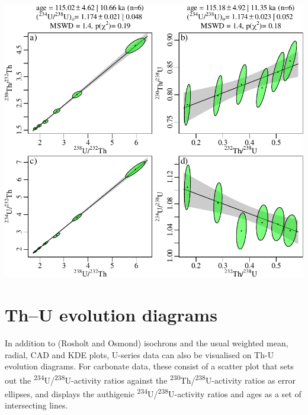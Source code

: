 \begin{refsection}
\noindent\begin{minipage}[t][][b]{.65\linewidth}
\includegraphics[width=\textwidth]{../figures/ThUisochron.pdf}
\end{minipage}
\begin{minipage}[t][][t]{.35\linewidth}
  \label{fig:ThUisochron}
\end{minipage}

\section{Th--U evolution diagrams}\label{sec:ThUevolution}

In addition to (Rosholt and Osmond) isochrons and the usual weighted
mean, radial, CAD and KDE plots, U-series data can also be visualised
on Th-U evolution diagrams.  For carbonate data, these consist of a
scatter plot that sets out the
\textsuperscript{234}U/\textsuperscript{238}U-activity ratios against
the \textsuperscript{230}Th/\textsuperscript{238}U-activity ratios as
error ellipses, and displays the authigenic
\textsuperscript{234}U/\textsuperscript{238}U-activity ratios and ages
as a set of intersecting lines.\\


\end{refsection}
